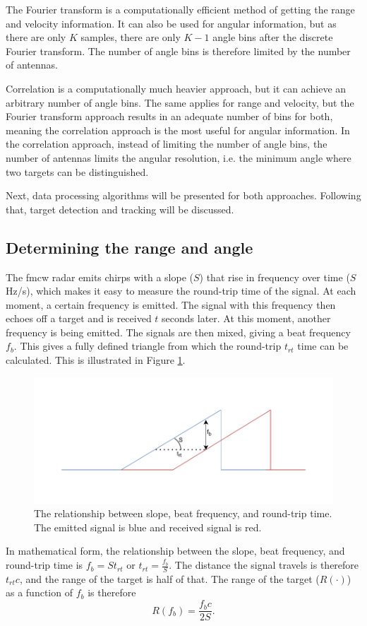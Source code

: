 The Fourier transform is a computationally efficient method of getting the range and velocity information.
It can also be used for angular information,
but as there are only $K$ samples, 
there are only $K-1$ angle bins after the discrete Fourier transform.
The number of angle bins is therefore limited by the number of antennas.

Correlation is a computationally much heavier approach,
but it can achieve an arbitrary number of angle bins.
The same applies for range and velocity,
but the Fourier transform approach results in an adequate number of bins for both,
meaning the correlation approach is the most useful for angular information.
In the correlation approach, instead of limiting the number of angle bins,
the number of antennas limits the angular resolution,
i.e. the minimum angle where two targets can be distinguished.

Next, data processing algorithms will be presented for both approaches.
Following that, target detection and tracking will be discussed.

\subsection{Determining the range and angle}
\label{sec:range_angle}
The \gls{fmcw} radar emits chirps with a slope ($S$) that rise in frequency over time ($S$ Hz/s),
which makes it easy to measure the round-trip time of the signal.
At each moment, a certain frequency is emitted.
The signal with this frequency then echoes off a target and is received $t$ seconds later.
At this moment, another frequency is being emitted.
The signals are then mixed, giving a beat frequency $f_b$.
This gives a fully defined triangle from which the round-trip $t_{rt}$ time can be calculated.
This is illustrated in Figure \ref{fig:fmcw_triangle}.
\begin{figure}
    \centering
    \includegraphics[width=.9\textwidth]{fig/2/fmcw_triangle.pdf}
    \caption{The relationship between slope, beat frequency, and round-trip time.
    The emitted signal is blue and received signal is red.}
    \label{fig:fmcw_triangle}
\end{figure}
In mathematical form, the relationship between the slope, beat frequency, and round-trip time is
$f_b = S t_{rt}$ or $t_{rt} = \frac{f_b}{S}$.
The distance the signal travels is therefore $t_{rt}c$,
and the range of the target is half of that.
The range of the target ($R(\cdot)$) as a function of $f_b$ is therefore
\begin{equation}
    \label{fmcw_range}
    R \left ( f_{b} \right ) = \frac{f_{b}c}{2S}.
\end{equation}

